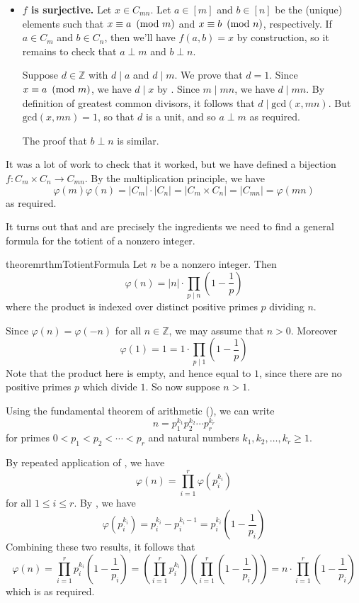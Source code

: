 \begin{cproof}
\begin{itemize}
\item \textbf{$f$ is surjective.} Let $x \in C_{mn}$. Let $a \in [m]$ and $b \in [n]$ be the (unique) elements such that $x \equiv a ~\left(\text{mod}~m\right)$ and $x \equiv b ~\left(\text{mod}~n\right)$, respectively. If $a \in C_m$ and $b \in C_n$, then we'll have $f(a,b)=x$ by construction, so it remains to check that $a \perp m$ and $b \perp n$.

Suppose $d \in \mathbb{Z}$ with $d \mid a$ and $d \mid m$. We prove that $d=1$. Since $x \equiv a ~\left(\text{mod}~m\right)$, we have $d \mid x$ by . Since $m \mid mn$, we have $d \mid mn$. By definition of greatest common divisors, it follows that $d \mid \mathrm{gcd}(x,mn)$. But $\mathrm{gcd}(x,mn)=1$, so that $d$ is a unit, and so $a \perp m$ as required.

The proof that $b \perp n$ is similar.
\end{itemize}
It was a lot of work to check that it worked, but we have defined a bijection $f : C_m \times C_n \to C_{mn}$. By the multiplication principle, we have
\[ \varphi(m) \varphi(n) = |C_m| \cdot |C_n| = |C_m \times C_n| = |C_{mn}| = \varphi(mn) \]
as required.
\end{cproof}

It turns out that  and  are precisely the ingredients we need to find a general formula for the totient of a nonzero integer.

\begin{restatable}{theorem}{rthmTotientFormula}
\label{thmTotientFormula}
Let $n$ be a nonzero integer. Then
\[ \varphi(n) = |n| \cdot \prod_{p \mid n} \left( 1 - \frac{1}{p} \right) \]
where the product is indexed over distinct positive primes $p$ dividing $n$.
\end{restatable}
\begin{cproof}
Since $\varphi(n) = \varphi(-n)$ for all $n \in \mathbb{Z}$, we may assume that $n>0$. Moreover
\[ \varphi(1) = 1 = 1 \cdot \prod_{p \mid 1} \left( 1 - \frac{1}{p} \right) \]
Note that the product here is empty, and hence equal to $1$, since there are no positive primes $p$ which divide $1$. So now suppose $n>1$.

Using the fundamental theorem of arithmetic (), we can write
\[ n = p_1^{k_1}p_2^{k_2} \cdots p_r^{k_r} \]
for primes $0<p_1<p_2<\cdots<p_r$ and natural numbers $k_1,k_2,\dots,k_r \ge 1$.

By repeated application of , we have
\[ \varphi(n) = \prod_{i=1}^r \varphi(p_i^{k_i}) \]
for all $1 \le i \le r$. By , we have
\[ \varphi(p_i^{k_i}) = p_i^{k_i}-p_i^{k_i-1} = p_i^{k_i} \left( 1-\frac{1}{p_i} \right) \]
Combining these two results, it follows that
\[ \varphi(n) = \prod_{i=1}^r p_i^{k_i} \left( 1 - \frac{1}{p_i} \right) = \left(\prod_{i=1}^r p_i^{k_i} \right) \left( \prod_{i=1}^r \left( 1 - \frac{1}{p_i} \right) \right) = n \cdot \prod_{i=1}^r \left( 1 - \frac{1}{p_i} \right) \]
which is as required.
\end{cproof}